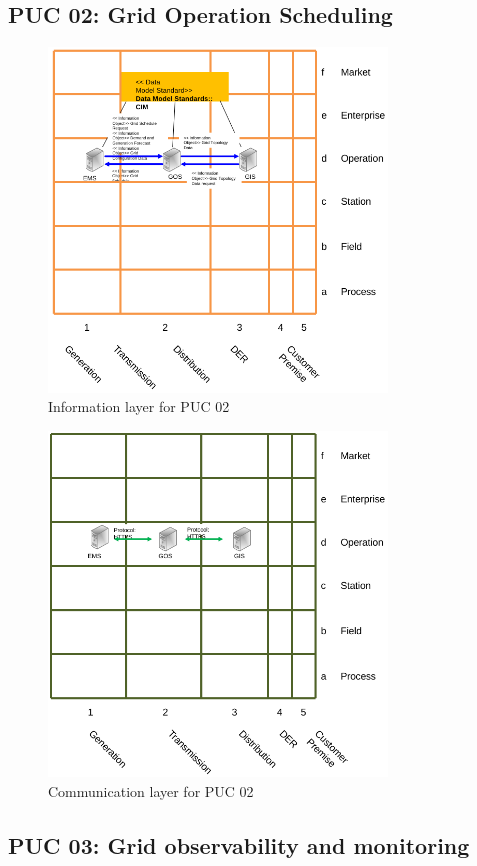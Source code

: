 \subsection*{PUC 02: Grid Operation Scheduling}


\begin{figure}[!htb]\centering
  \includegraphics[width=9.0cm]{Data/i2.png}
\caption{Information layer for PUC 02}
\label{fig:i2}
\end{figure}


\begin{figure}[!htb]\centering
  \includegraphics[width=9.0cm]{Data/c2.png}
\caption{Communication layer for PUC 02}
\label{fig:c2}
\end{figure}



\clearpage
\newpage
\subsection*{PUC 03: Grid observability and monitoring}


